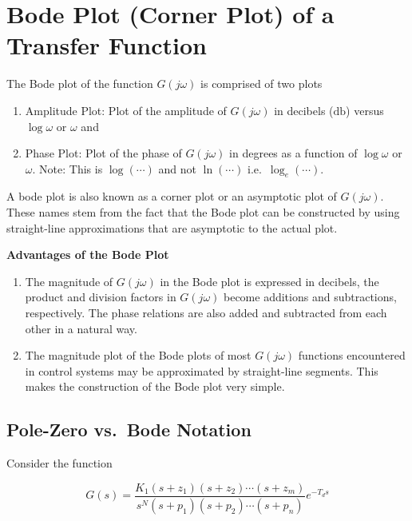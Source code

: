 \documentclass[
  14pt,
  a4paper,
  oneside,
  open=any,
  a4paper,
  14pt]{report}
\begin{document}
\section{Bode Plot (Corner Plot) of a Transfer
Function}\label{bode-plot-corner-plot-of-a-transfer-function}

The Bode plot of the function \(G(j\omega)\) is comprised of two plots

\begin{enumerate}
\def\labelenumi{\arabic{enumi}.}
\item
  Amplitude Plot: Plot of the amplitude of \(G(j\omega)\) in decibels
  (\(\unit{\decibel}\)) versus \(\log{\omega}\) or \(\omega\) and
\item
  Phase Plot: Plot of the phase of \(G(j\omega)\) in degrees as a
  function of \(\log{\omega}\) or \(\omega\). Note: This is
  \(\log(\cdots)\) and not \(\ln(\cdots)\) i.e.~\(\log_e(\cdots)\).
\end{enumerate}

A bode plot is also known as a corner plot or an asymptotic plot of
\(G(j\omega)\). These names stem from the fact that the Bode plot can be
constructed by using straight-line approximations that are asymptotic to
the actual plot.

\textbf{Advantages of the Bode Plot}

\begin{enumerate}
\def\labelenumi{\arabic{enumi}.}
\item
  The magnitude of \(G(j\omega)\) in the Bode plot is expressed in
  decibels, the product and division factors in \(G(j\omega)\) become
  additions and subtractions, respectively. The phase relations are also
  added and subtracted from each other in a natural way.
\item
  The magnitude plot of the Bode plots of most \(G(j\omega)\) functions
  encountered in control systems may be approximated by straight-line
  segments. This makes the construction of the Bode plot very simple.
\end{enumerate}

\subsection{Pole-Zero vs.~Bode
Notation}\label{pole-zero-vs.-bode-notation}

Consider the function

\[
    G(s) = \dfrac{K_1(s+z_1)(s+z_2)\cdots(s+z_m)}{s^N(s+p_1)(s+p_2)\cdots(s+p_n)} e^{-T_ds}
\]
\end{document}
